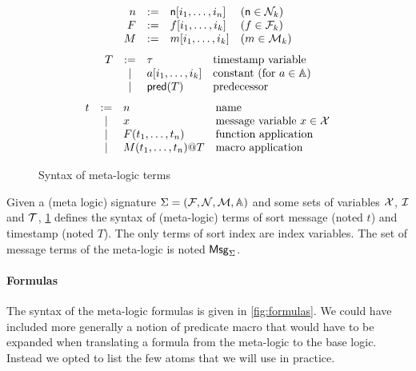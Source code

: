 \begin{figure}[h]
\[
  \begin{array}{rcll}
    n &:=& \mathsf{n}[i_1,\ldots,i_n] & (\mathsf{n}\in\mathcal{N}_k)
    \\
    F &:=& f[i_1,\ldots,i_k] & (f\in\mathcal{F}_k)
    \\
    M &:=& m[i_1,\ldots,i_k] & (m\in\mathcal{M}_k)
  \end{array}
\]
\[
  \begin{array}{rcll}
    T &:=& \tau & \text{timestamp variable} \\
      &\mid& a[i_1,\ldots,i_k] & \text{constant (for $a\in\mathbb{A}$)} \\
      &\mid & \textsf{pred}(T) & \text{predecessor}
\end{array}
   \]
\[
     \begin{array}{rcll}
    t & := & n &\text{name} \\
    & \mid & x  & \text{message variable $x\in\mathcal{X}$} \\
    & \mid & F(t_1,\dots,t_n) &\text{function application}\\
    & \mid & M(t_1,\ldots,t_n)@T &\text{macro application}\\
       \end{array}
     \]
     \caption{Syntax of meta-logic terms}\label{fig:terms}
\end{figure}

\begin{definition}
  Given a (meta logic) signature $\Sigma = (\mathcal{F},\mathcal{N},\mathcal{M},\mathbb{A})$
  and some sets of variables
  $\mathcal{X}$, $\mathcal{I}$ and $\mathcal{T}$,
  \cref{fig:terms} defines the syntax of (meta-logic) terms
  of sort message (noted $t$) and timestamp (noted $T$).
  The only terms of sort index are index variables.
  The set of message terms of the meta-logic is noted $\mathsf{Msg}_\Sigma$.
\end{definition}


\paragraph{Formulas}

The syntax of the meta-logic formulas is given in \cref{fig:formulas}.
We could have included more generally a notion of predicate macro that
would have to be expanded when translating a formula from the meta-logic
to the base logic. Instead we opted to list the few atoms that we
will use in practice.

